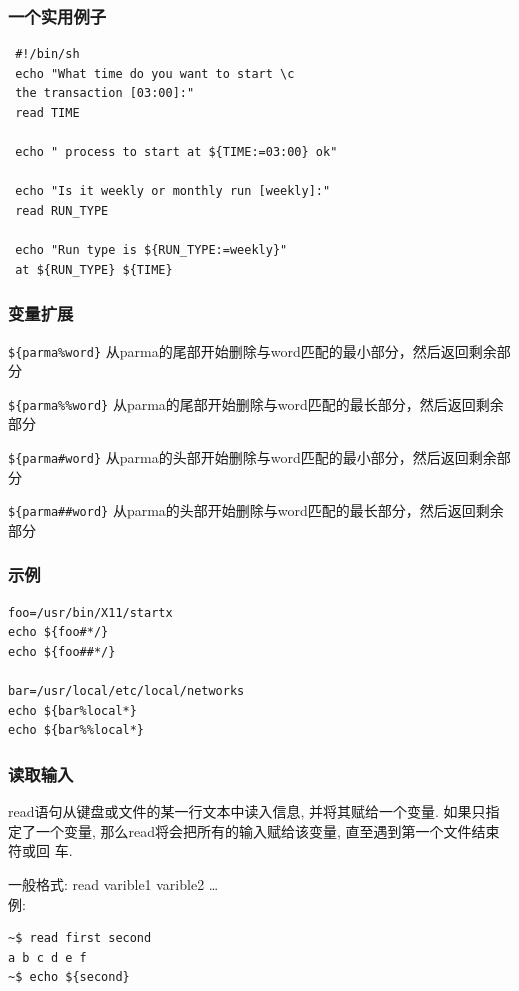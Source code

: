 \documentclass[compress]{beamer}
\begin{document}
\begin{frame}[fragile]
\frametitle{一个实用例子}

\begin{lstlisting}
 #!/bin/sh
 echo "What time do you want to start \c
 the transaction [03:00]:"
 read TIME

 echo " process to start at ${TIME:=03:00} ok"

 echo "Is it weekly or monthly run [weekly]:"
 read RUN_TYPE

 echo "Run type is ${RUN_TYPE:=weekly}"
 at ${RUN_TYPE} ${TIME}
\end{lstlisting}

\end{frame}

\begin{frame}[fragile]
\frametitle{变量扩展}
\verb+${parma%word}+
从parma的尾部开始删除与word匹配的最小部分，然后返回剩余部分

\verb+${parma%%word}+
从parma的尾部开始删除与word匹配的最长部分，然后返回剩余部分

\verb+${parma#word}+
从parma的头部开始删除与word匹配的最小部分，然后返回剩余部分

\verb+${parma##word}+
从parma的头部开始删除与word匹配的最长部分，然后返回剩余部分
\end{frame}

\begin{frame}[fragile]
  \frametitle{示例}
\begin{lstlisting}
foo=/usr/bin/X11/startx
echo ${foo#*/}
echo ${foo##*/}

bar=/usr/local/etc/local/networks
echo ${bar%local*}
echo ${bar%%local*}
\end{lstlisting}
\end{frame}

\begin{frame}[fragile]
\frametitle{读取输入}
\alert{read}语句从键盘或文件的某一行文本中读入信息,
并将其赋给一个变量. 如果只指定了一个变量,
那么\alert{read}将会把所有的输入赋给该变量,
直至遇到第一个文件结束符或回 车.

一般格式:  \alert{read varible1 varible2 \ldots}\\
例:\\
\begin{Verbatim}
~$ read first second
a b c d e f 
~$ echo ${second}
\end{Verbatim}

\end{frame}
\end{document}
